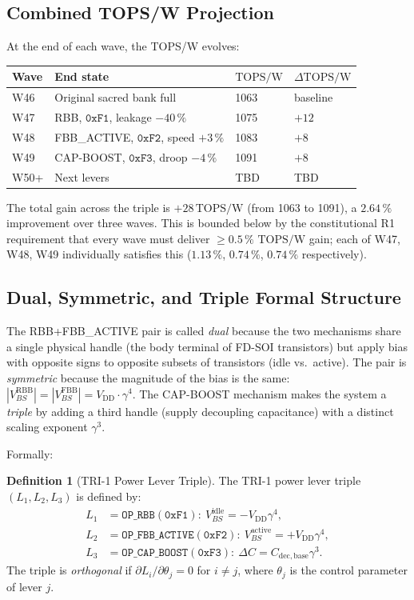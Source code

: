 \documentclass[12pt,a4paper]{report}
\theoremstyle{plain}
\theoremstyle{definition}
\newtheorem{definition}[theorem]{Definition}
\theoremstyle{remark}
\newcommand{\Vdd}{V_{\mathrm{DD}}}
\newcommand{\Cbase}{C_{\mathrm{dec,base}}}
\newcommand{\deltaC}{\Delta C}
\newcommand{\TOPSW}{\mathrm{TOPS/W}}
\begin{document}
\subsection{Combined TOPS/W Projection}
\label{ssec:combined-topsw}

At the end of each wave, the TOPS/W evolves:
\begin{center}
\begin{tabular}{llll}
  \toprule
  Wave & End state & $\TOPSW$ & $\Delta\TOPSW$ \\
  \midrule
  W46 & Original sacred bank full & 1063 & baseline \\
  W47 & RBB, $\texttt{0xF1}$, leakage $-40\,\%$ & 1075 & $+12$ \\
  W48 & FBB\_ACTIVE, $\texttt{0xF2}$, speed $+3\,\%$ & 1083 & $+8$ \\
  W49 & CAP-BOOST, $\texttt{0xF3}$, droop $-4\,\%$ & 1091 & $+8$ \\
  W50+ & Next levers & TBD & TBD \\
  \bottomrule
\end{tabular}
\end{center}

The total gain across the triple is $+28\,\TOPSW$
(from 1063 to 1091), a $2.64\,\%$ improvement over three waves.
This is bounded below by the constitutional R1 requirement that every
wave must deliver $\geq 0.5\,\%$ $\TOPSW$ gain; each of W47, W48, W49
individually satisfies this ($1.13\,\%$, $0.74\,\%$, $0.74\,\%$ respectively).

\subsection{Dual, Symmetric, and Triple Formal Structure}
\label{ssec:dual-symmetric-triple}

The RBB+FBB\_ACTIVE pair is called \emph{dual} because the two mechanisms
share a single physical handle (the body terminal of FD-SOI transistors)
but apply bias with opposite signs to opposite subsets of transistors
(idle vs.\ active).
The pair is \emph{symmetric} because the magnitude of the bias is the same:
$|V_{BS}^{\mathrm{RBB}}| = |V_{BS}^{\mathrm{FBB}}| = \Vdd \cdot \gamma^{4}$.
The CAP-BOOST mechanism makes the system a \emph{triple} by adding a third
handle (supply decoupling capacitance) with a distinct scaling exponent
$\gamma^{3}$.

Formally:
\begin{definition}[TRI-1 Power Lever Triple]
  The TRI-1 power lever triple $(L_1, L_2, L_3)$ is defined by:
  \begin{align}
    L_1 &= \texttt{OP\_RBB} (\texttt{0xF1}):\ V_{BS}^{\mathrm{idle}} = -\Vdd\gamma^{4},\\
    L_2 &= \texttt{OP\_FBB\_ACTIVE} (\texttt{0xF2}):\ V_{BS}^{\mathrm{active}} = +\Vdd\gamma^{4},\\
    L_3 &= \texttt{OP\_CAP\_BOOST} (\texttt{0xF3}):\ \deltaC = \Cbase\gamma^{3}.
  \end{align}
  The triple is \emph{orthogonal} if $\partial L_i / \partial \theta_j = 0$
  for $i \neq j$, where $\theta_j$ is the control parameter of lever $j$.
\end{definition}
\end{document}
